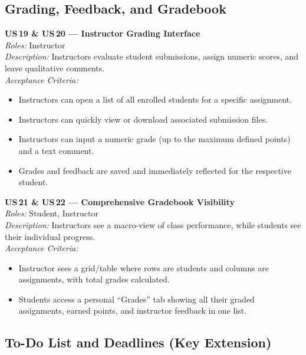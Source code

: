 \documentclass[12pt, a4paper]{article}
\begin{document}
\subsection{Grading, Feedback, and Gradebook}

\begin{userstory}
  \textbf{US\,19 \& US\,20 — Instructor Grading Interface}\\[4pt]
  \textit{Roles:} Instructor\\[2pt]
  \textit{Description:} Instructors evaluate student submissions, assign
  numeric scores, and leave qualitative comments.\\[4pt]
  \textit{Acceptance Criteria:}
  \begin{itemize}
    \item Instructors can open a list of all enrolled students for a specific
          assignment.
    \item Instructors can quickly view or download associated submission files.
    \item Instructors can input a numeric grade (up to the maximum defined
          points) and a text comment.
    \item Grades and feedback are saved and immediately reflected for the
          respective student.
  \end{itemize}
\end{userstory}

\begin{userstory}
  \textbf{US\,21 \& US\,22 — Comprehensive Gradebook Visibility}\\[4pt]
  \textit{Roles:} Student, Instructor\\[2pt]
  \textit{Description:} Instructors see a macro-view of class performance,
  while students see their individual progress.\\[4pt]
  \textit{Acceptance Criteria:}
  \begin{itemize}
    \item Instructor sees a grid/table where rows are students and columns are
          assignments, with total grades calculated.
    \item Students access a personal ``Grades'' tab showing all their graded
          assignments, earned points, and instructor feedback in one list.
  \end{itemize}
\end{userstory}

\subsection{To-Do List and Deadlines \texorpdfstring{\normalfont\small(Key Extension)}{}}
\end{document}
